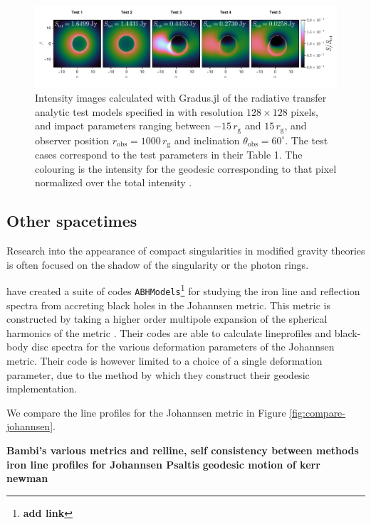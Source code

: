 \documentclass[fleqn,usenatbib]{mnras}
\newcommand{\todo}[1]{{\bf \color{red} #1}}
\newcommand{\Gradus}{Gradus.jl }
\newcommand{\rg}{r_\text{g}}
\begin{document}
\begin{figure}
	\centering
	\includegraphics[width=0.99\linewidth]{figures/radiative-transfer.gold.pdf}
	\caption{Intensity images calculated with \Gradus of the radiative transfer analytic test models specified in \citet{gold_verification_2020} with resolution $128 \times 128$ pixels, and impact parameters ranging between $-15\, \rg$ and $15\, \rg$, and observer position $r_\text{obs} = 1000\, \rg$ and inclination $\theta_\text{obs} = 60^\circ$. The test cases correspond to the test parameters in their Table 1. The colouring is the intensity for the geodesic corresponding to that pixel normalized over the total intensity .}
	\label{fig:gold-test-problems}
\end{figure}

\subsection{Other spacetimes}

Research into the appearance of compact singularities in modified gravity theories is often focused on the shadow of the singularity or the photon rings.

\cite{bambi_testing_2017,abdikamalov_testing_2020} have created a suite of codes \texttt{ABHModels}\footnote{\todo{add link}} for studying the iron line and reflection spectra from accreting black holes in the Johannsen metric. This metric is constructed by taking a higher order multipole expansion of the spherical harmonics of the metric \citep{johannsen_regular_2013}. Their codes are able to calculate lineprofiles and black-body disc spectra for the various deformation parameters of the Johannsen metric. Their code is however limited to a choice of a single deformation parameter, due to the method by which they construct their geodesic implementation. 

We compare the line profiles for the Johannsen metric in Figure \ref{fig:compare-johannsen}.

\todo{Bambi's various metrics and relline, self consistency between methods}
\todo{iron line profiles for Johannsen Psaltis}
\todo{geodesic motion of kerr newman}
\end{document}
